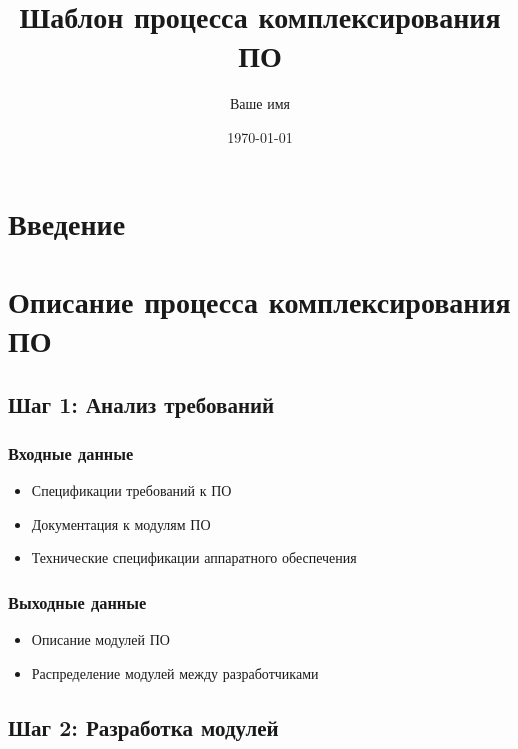 \documentclass{article}
\title{Шаблон процесса комплексирования ПО}
\author{Ваше имя}
\date{\today}
\begin{document}
\maketitle

\section{Введение}

\lipsum[1] %

\section{Описание процесса комплексирования ПО}

\lipsum[2] %

\subsection{Шаг 1: Анализ требований}

\lipsum[3] %

\subsubsection{Входные данные}

\begin{itemize}
    \item Спецификации требований к ПО
    \item Документация к модулям ПО
    \item Технические спецификации аппаратного обеспечения
\end{itemize}

\subsubsection{Выходные данные}

\begin{itemize}
    \item Описание модулей ПО
    \item Распределение модулей между разработчиками
\end{itemize}

\subsection{Шаг 2: Разработка модулей}
\end{document}
